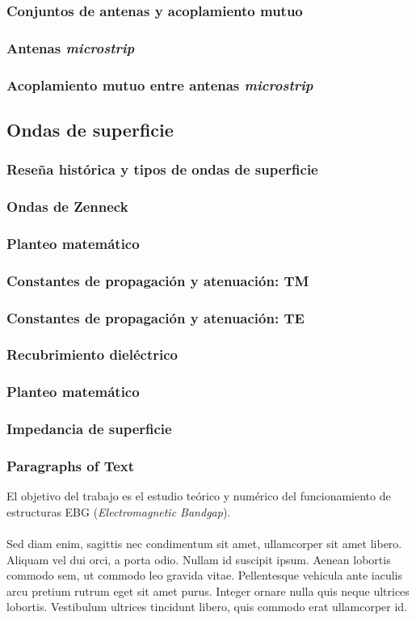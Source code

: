 \documentclass{beamer}
\begin{document}
			\begin{frame}
			\frametitle{Conjuntos de antenas y acoplamiento mutuo}
			\end{frame}
		
			\begin{frame}
			\frametitle{Antenas \textit{microstrip}}
			\end{frame}
		
			\begin{frame}
			\frametitle{Acoplamiento mutuo entre antenas \textit{microstrip}}
			\end{frame}
	
	
	\subsection{Ondas de superficie}
		\begin{frame}
		\frametitle{Reseña histórica y tipos de ondas de superficie}
		\end{frame}
		
		\subsubsection{Ondas de Zenneck}
			
			\begin{frame}
			\frametitle{Planteo matemático}
			\end{frame}
		
			\begin{frame}
			\frametitle{Constantes de propagación y atenuación: TM}
			\end{frame}	
		
			\begin{frame}
			\frametitle{Constantes de propagación y atenuación: TE}
			\end{frame}
		
		\subsubsection{Recubrimiento dieléctrico}
			
			\begin{frame}
			\frametitle{Planteo matemático}
			\end{frame}
			
			\begin{frame}
			\frametitle{Impedancia de superficie}
			\end{frame}
		

\begin{frame}
\frametitle{Paragraphs of Text}
El objetivo del trabajo es el estudio teórico y numérico del funcionamiento de estructuras EBG (\textit{Electromagnetic Bandgap}).\\~\\

Sed diam enim, sagittis nec condimentum sit amet, ullamcorper sit amet libero. Aliquam vel dui orci, a porta odio. Nullam id suscipit ipsum. Aenean lobortis commodo sem, ut commodo leo gravida vitae. Pellentesque vehicula ante iaculis arcu pretium rutrum eget sit amet purus. Integer ornare nulla quis neque ultrices lobortis. Vestibulum ultrices tincidunt libero, quis commodo erat ullamcorper id.
\end{frame}
\end{document}
